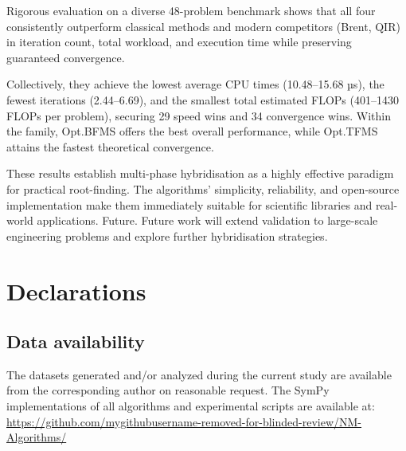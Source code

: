 \documentclass[amsmath, amssymb, aps]{revtex4-2}
\begin{document}
Rigorous evaluation on a diverse 48-problem benchmark shows that all four consistently outperform classical methods and modern competitors (Brent, QIR) in iteration count, total workload, and execution time while preserving guaranteed convergence.

Collectively, they achieve the lowest average CPU times (10.48–15.68 µs), the fewest iterations (2.44–6.69), and the smallest total estimated FLOPs (401–1430 FLOPs per problem), securing 29 speed wins and 34 convergence wins. Within the family, Opt.BFMS offers the best overall performance, while Opt.TFMS attains the fastest theoretical convergence.

These results establish multi-phase hybridisation as a highly effective paradigm for practical root-finding. The algorithms’ simplicity, reliability, and open-source implementation make them immediately suitable for scientific libraries and real-world applications. Future. Future work will extend validation to large-scale engineering problems and explore further hybridisation strategies.

\section{Declarations}\label{sec:declaration}

\subsection{Data availability}\label{sec:dataavailability}
The datasets generated and/or analyzed during the current study are available from the corresponding author on reasonable request. The SymPy implementations of all algorithms and experimental scripts are available at: \url{https://github.com/mygithubusername-removed-for-blinded-review/NM-Algorithms/}
\end{document}
